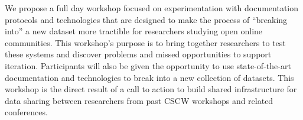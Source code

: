 We propose a full day workshop focused on
experimentation with documentation protocols and
technologies that are designed to make the process
of ``breaking into'' a new dataset more tractible for 
researchers studying open online communities.
This workshop's purpose is to bring together researchers
to test these systems and discover problems and missed
opportunities to support iteration.  Participants
will also be given the opportunity to use state-of-the-art
documentation and technologies to break into a new collection
of datasets.  This workshop is the direct result of a call
to action to build shared infrastructure for data sharing
between researchers from past CSCW workshops and related
conferences.
